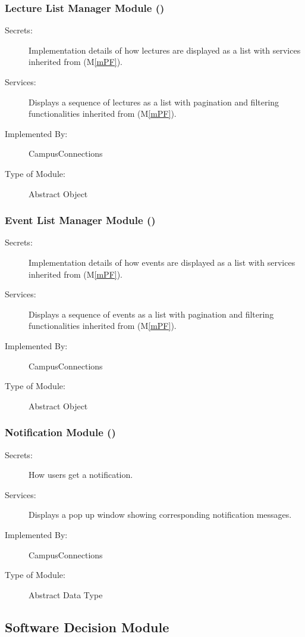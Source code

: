 \documentclass[12pt, titlepage]{article}
\newcommand{\mref}[1]{M\ref{#1}}
\begin{document}
  \subsubsection{Lecture List Manager Module (\label{mLL})}
  \begin{description}
  \item[Secrets:]Implementation details of how lectures are displayed as a list with services inherited from (\mref{mPF}).
  \item[Services:]Displays a sequence of lectures as a list with pagination and filtering functionalities inherited from (\mref{mPF}).
  \item[Implemented By:] CampusConnections
  \item[Type of Module:] Abstract Object
  \end{description}
  
  \subsubsection{Event List Manager Module (\label{mEL})}
  \begin{description}
  \item[Secrets:]Implementation details of how events are displayed as a list with services inherited from (\mref{mPF}).
  \item[Services:]Displays a sequence of events as a list with pagination and filtering functionalities inherited from (\mref{mPF}).
  \item[Implemented By:] CampusConnections
  \item[Type of Module:] Abstract Object
  \end{description}
  
  \subsubsection{Notification Module (\label{mNoti})}
  \begin{description}
  \item[Secrets:] How users get a notification.
  \item[Services:]Displays a pop up window showing corresponding notification messages.
  \item[Implemented By:] CampusConnections
  \item[Type of Module:] Abstract Data Type
  \end{description}
  
  \subsection{Software Decision Module}
\end{document}
